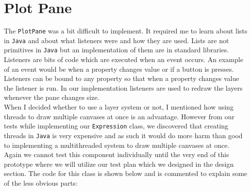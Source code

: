 \documentclass[../../../../main.tex]{subfiles}
\begin{document}
\section{Plot Pane}
The \texttt{PlotPane} was a bit difficult to implement. It required me to learn about lists in \texttt{Java}\cite{arrayListJava} and about what listeners\cite{listenersJava} were and how they are used. Lists are not primitives in \texttt{Java} but an implementation of them are in standard libraries. Listeners are bits of code which are executed when an event occurs. An example of an event would be when a property changes value or if a button is presses. Listeners can be bound to any property so that when a property changes value the listener is run. In our implementation listeners are used to redraw the layers whenever the pane changes size.\\
When I decided whether to use a layer system or not, I mentioned how using threads to draw multiple canvases at once is an advantage. However from our tests while implementing our \texttt{Expression} class, we discovered that creating threads in \texttt{Java} is very expensive and as such it would do more harm than good to implementing a multithreaded system to draw multiple canvases at once. \\
Again we cannot test this component individually until the very end of this prototype where we will utilize our test plan which we designed in the design section. The code for this class is shown below and is commented to explain some of the less obvious parts:
\end{document}

